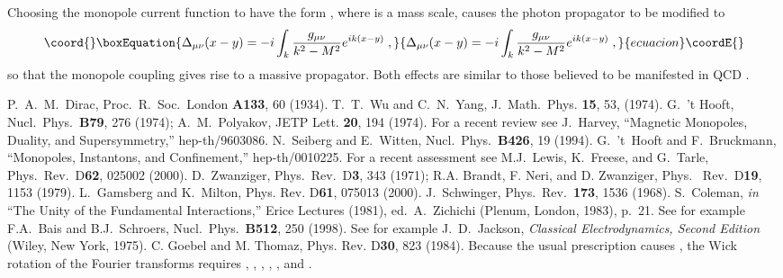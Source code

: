 \documentclass[a4paper,a4paper]{article}
\begin{document}
Choosing the monopole current function to have the form \coordHE{}, where \coordHE{} is a mass scale, causes the photon propagator to be modified to
\begin{equation}\coord{}\boxEquation{
\label{MassivePropagator}
\Delta_{\mu \nu} (x - y)  = - i \int_k \frac{g_{\mu \nu}}{k^2 - M^2} e^{ik ( x - y ) } \; ,
}{
\Delta_{\mu \nu} (x - y)  = - i \int_k \frac{g_{\mu \nu}}{k^2 - M^2} e^{ik ( x - y ) } \; ,
}{ecuacion}\coordE{}\end{equation}
so that the monopole coupling gives rise to a massive propagator. Both effects are similar to those believed to be manifested in QCD \cite{tHooftBruckmann}.

\begin{thebibliography}{99}
 P.~A.~M.~Dirac, Proc.~R.~Soc.~London {\bf A133}, 60 (1934).
 T.~T.~Wu and C.~N.~Yang, J.~Math.~Phys. {\bf 15}, 53, (1974).
 G.~'t Hooft, Nucl.~Phys.~{\bf B79}, 276 (1974); A.~M.~Polyakov, JETP Lett. {\bf 20}, 194 (1974).
 For a recent review see J.~Harvey, ``Magnetic Monopoles, Duality, and Supersymmetry,'' hep-th/9603086. 
 N.~Seiberg and E.~Witten, Nucl.~Phys.~{\bf B426}, 19 (1994).
 G.~'t~Hooft and F.~Bruckmann, ``Monopoles, Instantons, and Confinement,'' hep-th/0010225.
 For a recent assessment see M.J.~Lewis, K.~Freese, and G.~Tarle, Phys.~Rev.~D{\bf 62}, 025002 (2000).
 D.~Zwanziger, Phys.~Rev.~D{\bf 3}, 343 (1971); R.A. Brandt,
F. Neri, and D. Zwanziger, Phys.~ Rev.~D{\bf 19}, 1153 (1979).
 L.~Gamsberg and K.~Milton, Phys. Rev. D{\bf 61}, 075013 (2000).
 J.~Schwinger, Phys.~Rev.~{\bf 173}, 1536 (1968).
 S.~Coleman, {\it in} ``The Unity of the Fundamental Interactions,''
Erice Lectures (1981), ed.~A.~Zichichi (Plenum, London, 1983), p.~21.
 See for example F.A.~Bais and B.J.~Schroers, Nucl.~Phys.~{\bf B512}, 250 (1998).
 See for example J.~D.~Jackson, {\it Classical Electrodynamics, Second Edition} (Wiley, New York, 1975).
 C. Goebel and M. Thomaz, Phys. Rev. D{\bf 30}, 823 (1984).
 Because the usual prescription \coordHE{} causes \coordHE{}, the Wick rotation of the Fourier transforms requires \coordHE{}, \coordHE{}, \coordHE{}, \coordHE{}, \coordHE{},  and \coordHE{}. 
\end{thebibliography}
\end{document}
